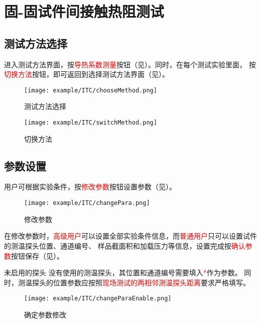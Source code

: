 \section{固-固试件间接触热阻测试}
\subsection{测试方法选择}
进入测试方法界面，按\textcolor{red}{导热系数测量}按钮（见）。同时，在每个测试实验里面，
按\textcolor{red}{切换方法}按钮，即可返回到选择测试方法界面（见）。
\begin{figure}[H]
	\centering
	\texttt{[image: example/ITC/chooseMethod.png]}
	\caption{ 测试方法选择 \label{fig:exmp_itc_chooseMethod}}
\end{figure}

\begin{figure}[H]
	\centering
	\texttt{[image: example/ITC/switchMethod.png]}
	\caption{ 切换方法 \label{fig:exmp_itc_switchMethod}}
\end{figure}

\subsection{参数设置}
用户可根据实验条件，按\textcolor{red}{修改参数}按钮设置参数（见）。
\begin{figure}[H]
	\centering
	\texttt{[image: example/ITC/changePara.png]}
	\caption{ 修改参数 \label{fig:exmp_itc_changePara}}
\end{figure}
在修改参数时，\textcolor{red}{高级用户}可以设置全部实验条件信息，而\textcolor{red}{普通用户}只可以设置试件的测温探头位置、通道编号、
样品截面积和加载压力等信息，设置完成按\textcolor{red}{确认参数}按钮保存（见）。
\begin{tips}{未启用的探头}
没有使用的测温探头，其位置和通道编号需要填入\textcolor{red}{*}作为参数。
同时，测温探头的位置参数应按照\textcolor{red}{现场测试的两相邻测温探头距离}要求严格填写。
\end{tips}
\begin{figure}[H]
	\centering
	\texttt{[image: example/ITC/changeParaEnable.png]}
	\caption{ 确定参数修改 \label{fig:exmp_itc_changeParaEnable}}
\end{figure}


